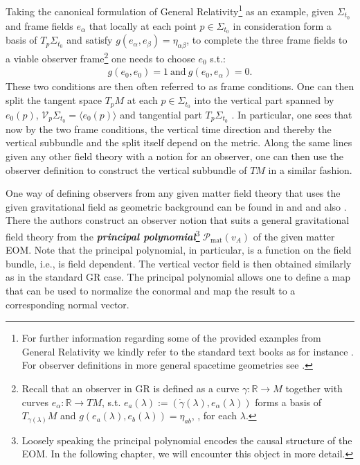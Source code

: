 Taking the canonical formulation of General Relativity\footnote{For further information regarding some of the provided examples from General Relativity we kindly refer to the standard text books as for instance \cite{Misner1973}. For observer definitions in more general spacetime geometries see \cite{2011PhRvD..83d4047R}.} as an example, given $\Sigma_{t_0}$ and frame fields $e_{\alpha}$ that locally at each point $p \in \Sigma_{t_0}$ in consideration form a basis of $T_p\Sigma_{t_0}$ and satisfy $g(e_{\alpha},e_{\beta}) = \eta_{\alpha \beta}$, to complete the three frame fields to a viable observer frame\footnote{Recall that an observer in GR is defined as a curve $\gamma : \mathbb{R} \rightarrow M$ together with curves $e_{\alpha} : \mathbb{R} \rightarrow TM$, s.t. $ e_a(\lambda) :=(\dot{\gamma}(\lambda),e_{\alpha}(\lambda))$ forms a basis of $T_{\gamma(\lambda)}M$ and $g(e_a(\lambda),e_b(\lambda)) = \eta_{ab}$, , for each $\lambda$.} one needs to choose $e_0$ s.t.:
\begin{align}
    g(e_0,e_0) = 1 \ \text{and} \ g(e_0,e_{\alpha}) = 0.
\end{align}
These two conditions are then often referred to as frame conditions. One can then split the tangent space $T_pM$ at each $p \in \Sigma_{t_0}$ into the vertical part spanned by $e_0(p)$,  $\mathcal{V}_p\Sigma_{t_0} = \langle  e_0(p) \rangle$ and tangential part $T_p\Sigma_{t_0}$ . In particular, one sees that now by the two frame conditions, the vertical time direction and thereby the vertical subbundle and the split itself depend on the metric. Along the same lines given any other field theory with a notion for an observer, one can then use the observer definition to construct the vertical subbundle of $TM$ in a similar fashion. 

One way of defining observers from any given matter field theory that uses the given gravitational field as geometric background can be found in \cite{2018PhRvD..97h4036D} and \cite{2011PhRvD..83d4047R} and also \cite{Rivera}. There the authors construct an observer notion that suits a general gravitational field theory from the \textbf{\textit{principal polynomial}}\footnote{Loosely speaking the principal polynomial encodes the causal structure of the EOM. In the following chapter, we will encounter this object in more detail.} $\mathcal{P}_{\text{mat}}(v_A)$ of the given matter EOM. Note that the principal polynomial, in particular, is a function on the field bundle, i.e., is field dependent. The vertical vector field is then obtained similarly as in the standard GR case. The principal polynomial allows one to define a map that can be used to normalize the conormal and map the result to a corresponding normal vector.

